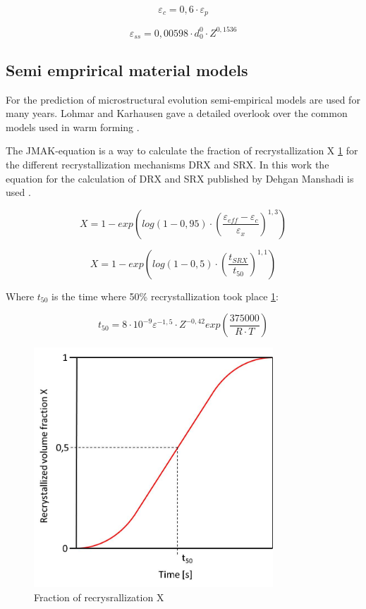 \begin{equation}
 \varepsilon_{c} = 0,6\cdot\varepsilon_{p}
\end{equation}

\begin{equation}
 \varepsilon_{ss} = 0,00598\cdot d_{0}^{0}\cdot Z^{0,1536}
\end{equation}

\subsection{Semi emprirical material models}
For the prediction of microstructural evolution semi-empirical models are used for many years. Lohmar and Karhausen gave a detailed overlook over the common models used in warm forming \cite{LOH10}\cite{KAR94}.\par 

The JMAK-equation is a way to calculate the fraction of recrystallization X \ref{img:JMAK} for the different recrystallization mechanisms DRX and SRX. In this work the equation for the calculation of DRX and SRX published by Dehgan Manshadi is used \cite{DEH08}.

\begin{equation}
 X = 1 - exp\left( log\left( 1-0,95\right) \cdot\left( \frac{\varepsilon_{eff}-\varepsilon_{c}}{\varepsilon_{x}}\right) ^{1,3}\right)
\end{equation}

\begin{equation}
 X = 1 - exp\left( log\left( 1-0,5\right) \cdot\left( \frac{t_{SRX}}{t_{50}}\right) ^{1,1}\right)
\end{equation}

Where $t_{50}$ is the time where 50\% recrystallization took place \ref{img:JMAK}:

\begin{equation}
 t_{50} = 8\cdot10^{-9}\varepsilon^{-1,5}\cdot Z^{-0,42}exp\left( \frac{375000}{R\cdot T}\right)
\end{equation}

\begin{figure}[htbp]
 \centering
 \includegraphics[width=0.8\textwidth]{images/JMAK}
 \caption{Fraction of recrysrallization X}
 \label{img:JMAK}
\end{figure}

